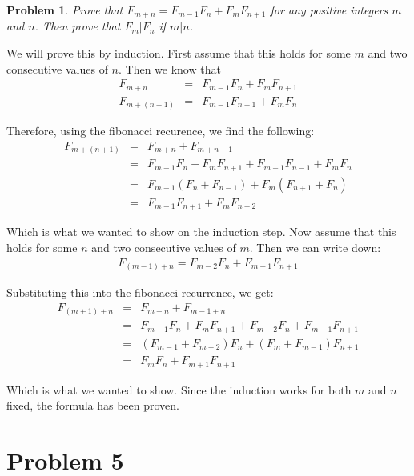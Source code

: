\documentclass[psamsfonts]{amsart}
\newtheorem{prob}{Problem}[section]
\newenvironment{sol}{{\bfseries Solution}}{\qedsymbol}
\theoremstyle{definition}
\theoremstyle{remark}
\numberwithin{equation}{section}
\begin{document}
\begin{prob}
Prove that $F_{m+n} = F_{m-1} F_n + F_m F_{n+1}$ for any positive integers $m$ and $n$. Then prove that $F_m | F_n$ if $m | n$. 
\end{prob}

\begin{sol}
We will prove this by induction. First assume that this holds for some $m$ and two consecutive values of $n$. Then we know that 
\begin{eqnarray}
F_{m+n} &=& F_{m-1} F_{n} + F_{m} F_{n+1} \\
F_{m + (n - 1)} &=& F_{m-1} F_{n-1} + F_{m} F_{n} 
\end{eqnarray}

Therefore, using the fibonacci recurence, we find the following:
\begin{eqnarray}
F_{m+(n+1)} &=& F_{m+n} + F_{m+n-1} \\
&=&  F_{m-1} F_{n} + F_{m} F_{n+1} +  F_{m-1} F_{n-1} + F_{m} F_{n}  \\
&=& F_{m-1} (F_{n} + F_{n-1} ) + F_{m} (F_{n+1} + F_{n} ) \\
&=& F_{m-1} F_{n+1} + F_m F_{n+2}
\end{eqnarray}

Which is what we wanted to show on the induction step. Now assume that this holds for some $n$ and two consecutive values of $m$. Then we can write down:
\begin{eqnarray}
 F_{(m-1) + n} = F_{m-2} F_{n} + F_{m-1} F_{n+1} 
\end{eqnarray}

Substituting this into the fibonacci recurrence, we get:
\begin{eqnarray}
F_{(m+1) + n} &=& F_{m+n} + F_{m-1+n} \\
&=& F_{m-1} F_n + F_{m} F_{n+1} + F_{m-2} F_n + F_{m-1} F_{n+1} \\
&=& (F_{m-1} + F_{m-2}) F_n + (F_{m} + F_{m-1}) F_{n+1} \\
&=& F_{m} F_{n} + F_{m+1} F_{n+1} 
\end{eqnarray}

Which is what we wanted to show. Since the induction works for both $m$ and $n$ fixed, the formula has been proven.
\end{sol}

\section{Problem 5}
\end{document}
